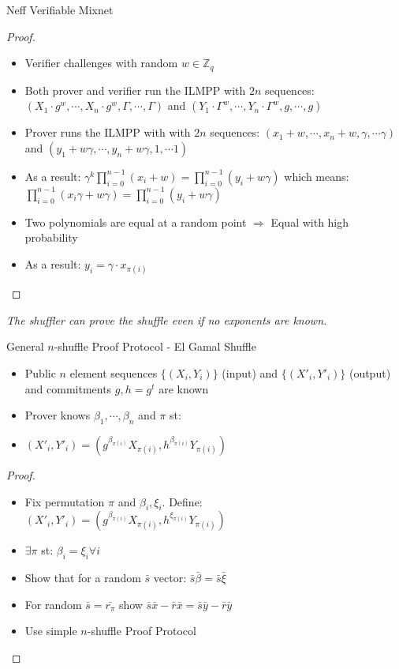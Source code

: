 \documentclass{beamer}
\begin{document}
\begin{frame}[allowframebreaks]{Neff Verifiable Mixnet}
\begin{proof}
\begin{itemize}
\item Verifier challenges with random $w \in \mathbb{Z}_q$
\item Both prover and verifier run the ILMPP with $2n$ sequences:
$ (X_1 \cdot g^w, \cdots, X_n \cdot g^w, \Gamma, \cdots, \Gamma) $ and $ (Y_1 \cdot \Gamma^w, \cdots, Y_n \cdot \Gamma^w, g, \cdots, g) $
\item Prover runs the ILMPP with with $2n$ sequences:
$ (x_1 + w, \cdots, x_n+w, \gamma, \cdots \gamma) $ and 
$ (y_1 + w \gamma, \cdots, y_n+w \gamma, 1, \cdots 1) $
\item As a result:
$\gamma^k \prod_{i=0}^{n-1}(x_i+w) = \prod_{i=0}^{n-1}(y_i+w   \gamma)$ which means:
$ \prod_{i=0}^{n-1}(x_i \gamma +w \gamma) = \prod_{i=0}^{n-1}(y_i+w \gamma) $
\item Two polynomials are equal at a random point $\Rightarrow$ Equal with high probability
\item As a  result: $y_i=\gamma \cdot x_{\pi(i)}$
\end{itemize}
\end{proof}

\framebreak 
\textit{The shuffler can prove the shuffle even if no exponents are known.}

\begin{block}{General $n$-shuffle Proof Protocol - El Gamal Shuffle}
\begin{itemize}
\item Public $n$ element sequences $\{(X_i,Y_i)\}$ (input) and $\{(X'_i,Y'_i)\}$ (output) and commitments $g,h=g^t$ are known
\item Prover knows $\beta_1,\cdots,\beta_n$ and $\pi$ st: 
\item $(X'_i,Y'_i) =  (g^{\beta_{\pi(i)}}X_{\pi(i)},h^{\beta_{\pi(i)}}Y_{\pi(i)})$
\end{itemize}
\end{block}

\begin{proof}
\begin{itemize}
\item Fix permutation $\pi$  and $\beta_i, \xi_i$. Define:
$(X'_i,Y'_i) =  (g^{\beta_{\pi(i)}}X_{\pi(i)},h^{\xi_{\pi(i)}}Y_{\pi(i)})$
\item $\exists \pi$ st: $\beta_i={\xi_i} \forall i$
\item Show that for a random $\bar{s}$ vector: $ \bar{s} \bar{\beta} = \bar{s} \bar{\xi} $
\item For random $\bar{s}=\bar{r_{\pi}}$ show
$ \bar{s} \bar{x} - \bar{r} \bar{x} = \bar{s} \bar{y} - \bar{r} \bar{y}$
\item Use simple $n$-shuffle Proof Protocol
\end{itemize}

\end{proof}


\end{frame}
\end{document}
